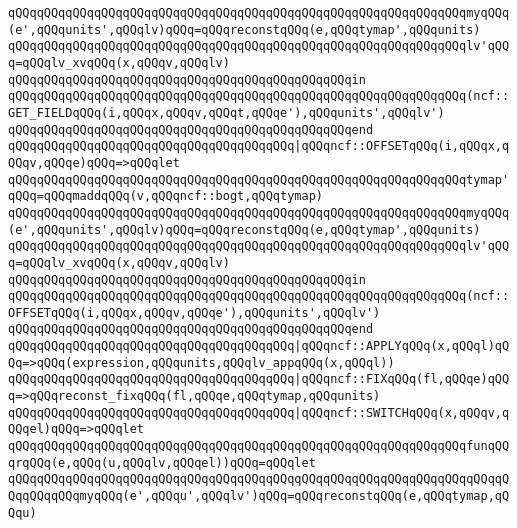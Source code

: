 \verb|qQQqqQQqqQQqqQQqqQQqqQQqqQQqqQQqqQQqqQQqqQQqqQQqqQQqqQQqqQQqqQQqmyqQQq(e',qQQqunits',qQQqlv)qQQq=qQQqreconstqQQq(e,qQQqtymap',qQQqunits)|\newline
\verb|qQQqqQQqqQQqqQQqqQQqqQQqqQQqqQQqqQQqqQQqqQQqqQQqqQQqqQQqqQQqqQQqlv'qQQq=qQQqlv_xvqQQq(x,qQQqv,qQQqlv)|\newline
\verb|qQQqqQQqqQQqqQQqqQQqqQQqqQQqqQQqqQQqqQQqqQQqqQQqin|\newline
\verb|qQQqqQQqqQQqqQQqqQQqqQQqqQQqqQQqqQQqqQQqqQQqqQQqqQQqqQQqqQQqqQQq(ncf::GET_FIELDqQQq(i,qQQqx,qQQqv,qQQqt,qQQqe'),qQQqunits',qQQqlv')|\newline
\verb|qQQqqQQqqQQqqQQqqQQqqQQqqQQqqQQqqQQqqQQqqQQqqQQqend|\newline
\verb|qQQqqQQqqQQqqQQqqQQqqQQqqQQqqQQqqQQqqQQq|\verb#|qQQqncf::OFFSETqQQq(i,qQQqx,qQQqv,qQQqe)qQQq=>qQQqlet#\newline
\verb|qQQqqQQqqQQqqQQqqQQqqQQqqQQqqQQqqQQqqQQqqQQqqQQqqQQqqQQqqQQqqQQqtymap'qQQq=qQQqmaddqQQq(v,qQQqncf::bogt,qQQqtymap)|\newline
\verb|qQQqqQQqqQQqqQQqqQQqqQQqqQQqqQQqqQQqqQQqqQQqqQQqqQQqqQQqqQQqqQQqmyqQQq(e',qQQqunits',qQQqlv)qQQq=qQQqreconstqQQq(e,qQQqtymap',qQQqunits)|\newline
\verb|qQQqqQQqqQQqqQQqqQQqqQQqqQQqqQQqqQQqqQQqqQQqqQQqqQQqqQQqqQQqqQQqlv'qQQq=qQQqlv_xvqQQq(x,qQQqv,qQQqlv)|\newline
\verb|qQQqqQQqqQQqqQQqqQQqqQQqqQQqqQQqqQQqqQQqqQQqqQQqin|\newline
\verb|qQQqqQQqqQQqqQQqqQQqqQQqqQQqqQQqqQQqqQQqqQQqqQQqqQQqqQQqqQQqqQQq(ncf::OFFSETqQQq(i,qQQqx,qQQqv,qQQqe'),qQQqunits',qQQqlv')|\newline
\verb|qQQqqQQqqQQqqQQqqQQqqQQqqQQqqQQqqQQqqQQqqQQqqQQqend|\newline
\verb|qQQqqQQqqQQqqQQqqQQqqQQqqQQqqQQqqQQqqQQq|\verb#|qQQqncf::APPLYqQQq(x,qQQql)qQQq=>qQQq(expression,qQQqunits,qQQqlv_appqQQq(x,qQQql))#\newline
\verb|qQQqqQQqqQQqqQQqqQQqqQQqqQQqqQQqqQQqqQQq|\verb#|qQQqncf::FIXqQQq(fl,qQQqe)qQQq=>qQQqreconst_fixqQQq(fl,qQQqe,qQQqtymap,qQQqunits)#\newline
\verb|qQQqqQQqqQQqqQQqqQQqqQQqqQQqqQQqqQQqqQQq|\verb#|qQQqncf::SWITCHqQQq(x,qQQqv,qQQqel)qQQq=>qQQqlet#\newline
\verb|qQQqqQQqqQQqqQQqqQQqqQQqqQQqqQQqqQQqqQQqqQQqqQQqqQQqqQQqqQQqqQQqfunqQQqrqQQq(e,qQQq(u,qQQqlv,qQQqel))qQQq=qQQqlet|\newline
\verb|qQQqqQQqqQQqqQQqqQQqqQQqqQQqqQQqqQQqqQQqqQQqqQQqqQQqqQQqqQQqqQQqqQQqqQQqqQQqqQQqmyqQQq(e',qQQqu',qQQqlv')qQQq=qQQqreconstqQQq(e,qQQqtymap,qQQqu)|\newline
